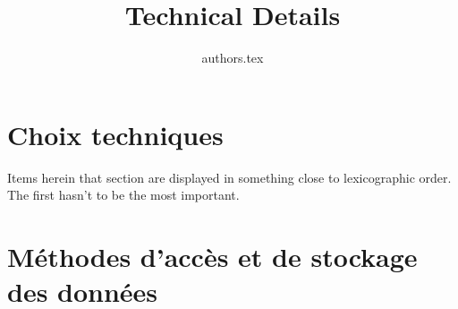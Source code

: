 \documentclass[12pt,onecolumn]{book}
\title{Technical Details}
\author{{authors.tex}}
\begin{document}
\maketitle

\tableofcontents

\chapter{Choix techniques}
Items herein that section are displayed in something close to lexicographic order. The first hasn't to be the most important.

\chapter{Méthodes d'accès et de stockage des données}

\end{document}
